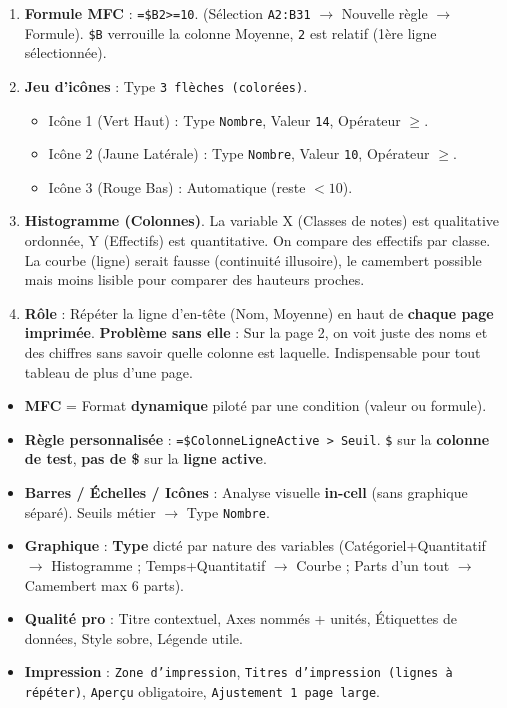 \documentclass[11pt]{article}
\begin{document}
\begin{corrige}
\begin{enumerate}
    \item \textbf{Formule MFC} : \texttt{=\$B2>=10}. (Sélection \texttt{A2:B31} $\to$ Nouvelle règle $\to$ Formule). \texttt{\$B} verrouille la colonne Moyenne, \texttt{2} est relatif (1ère ligne sélectionnée).
    \item \textbf{Jeu d'icônes} : Type \texttt{3 flèches (colorées)}.
    \begin{itemize}
        \item Icône 1 (Vert Haut) : Type \texttt{Nombre}, Valeur \texttt{14}, Opérateur \texttt{$\ge$}.
        \item Icône 2 (Jaune Latérale) : Type \texttt{Nombre}, Valeur \texttt{10}, Opérateur \texttt{$\ge$}.
        \item Icône 3 (Rouge Bas) : Automatique (reste $< 10$).
    \end{itemize}
    \item \textbf{Histogramme (Colonnes)}. La variable X (Classes de notes) est qualitative ordonnée, Y (Effectifs) est quantitative. On compare des effectifs par classe. La courbe (ligne) serait fausse (continuité illusoire), le camembert possible mais moins lisible pour comparer des hauteurs proches.
    \item \textbf{Rôle} : Répéter la ligne d'en-tête (Nom, Moyenne) en haut de \textbf{chaque page imprimée}. \textbf{Problème sans elle} : Sur la page 2, on voit juste des noms et des chiffres sans savoir quelle colonne est laquelle. Indispensable pour tout tableau de plus d'une page.
\end{enumerate}
\end{corrige}

\begin{aretenir}
\begin{itemize}
    \item \textbf{MFC} = Format \textbf{dynamique} piloté par une condition (valeur ou formule).
    \item \textbf{Règle personnalisée} : \texttt{=\$ColonneLigneActive > Seuil}. \texttt{\$} sur la \textbf{colonne de test}, \textbf{pas de \$} sur la \textbf{ligne active}.
    \item \textbf{Barres / Échelles / Icônes} : Analyse visuelle \textbf{in-cell} (sans graphique séparé). Seuils métier $\to$ Type \texttt{Nombre}.
    \item \textbf{Graphique} : \textbf{Type} dicté par nature des variables (Catégoriel+Quantitatif $\to$ Histogramme ; Temps+Quantitatif $\to$ Courbe ; Parts d'un tout $\to$ Camembert max 6 parts).
    \item \textbf{Qualité pro} : Titre contextuel, Axes nommés + unités, Étiquettes de données, Style sobre, Légende utile.
    \item \textbf{Impression} : \texttt{Zone d'impression}, \texttt{Titres d'impression (lignes à répéter)}, \texttt{Aperçu} obligatoire, \texttt{Ajustement 1 page large}.
\end{itemize}
\end{aretenir}
\end{document}
